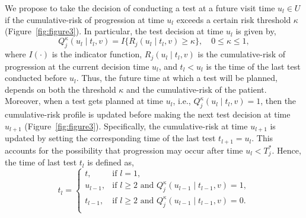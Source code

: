 \documentclass[AMA,STIX1COL]{WileyNJD-v2}
\begin{document}
We propose to take the decision of conducting a test at a future visit time $u_l \in U$ if the cumulative-risk of progression at time $u_l$ exceeds a certain risk threshold $\kappa$ (Figure~\ref{fig:figure3}). In particular, the test decision at time $u_l$ is given by,
\begin{equation}
\label{eq:personalized_decision_grid}
Q_j^\kappa (u_l \mid t_l, v) = I \big \{ R_j(u_l \mid t_l, v) \geq \kappa \big\}, \quad 0 \leq \kappa \leq 1,
\end{equation}
where $I(\cdot)$ is the indicator function, $R_j(u_l \mid t_l, v)$ is the cumulative-risk of progression at the current decision time $u_l$, and $t_l < u_l$ is the time of the last test conducted before $u_l$. Thus, the future time at which a test will be planned, depends on both the threshold $\kappa$ and the cumulative-risk of the patient. Moreover, when a test gets planned at time $u_l$, i.e., $Q_j^\kappa (u_l \mid t_l, v) = 1$, then the cumulative-risk profile is updated before making the next test decision at time $u_{l+1}$ (Figure~\ref{fig:figure3}). Specifically, the cumulative-risk at time $u_{l+1}$ is updated by setting the corresponding time of the last test $t_{l+1}=u_l$. This accounts for the possibility that progression may occur after time $u_l < T^*_j$. Hence, the time of last test $t_l$ is defined as,
\begin{equation*}
t_l = \left \{ 
\begin{array}{ll}
t, & \mbox{if } l = 1,\\
u_{l-1}, & \mbox{if } l \geq 2 \mbox{ and } Q_j^\kappa (u_{l-1} \mid t_{l-1}, v) = 1,\\
t_{l-1}, & \mbox{if } l \geq 2 \mbox{ and } Q_j^\kappa (u_{l-1} \mid t_{l-1}, v) = 0.\\
\end{array}
\right.
\end{equation*}
\end{document}
